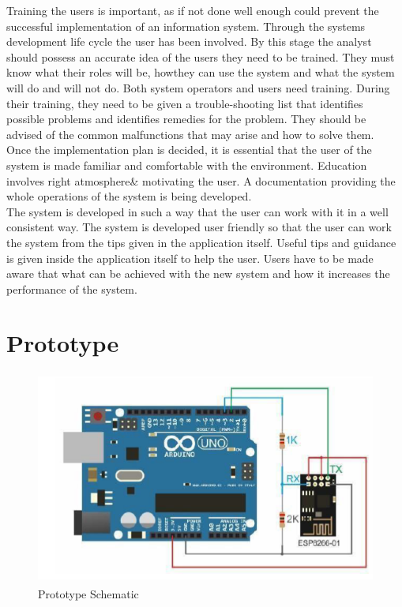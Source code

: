 Training the users is important, as if not done well enough could prevent the successful implementation of an information system. Through the systems development life cycle the user has been involved. By this stage the analyst should possess an accurate idea of the users they need to be trained. They must know what their roles will be, howthey can use the system and what the system will do and will not do. Both system operators and users need training. During their training, they need to be given a trouble-shooting list that identifies possible problems and identifies remedies for the problem. They should be advised of the common malfunctions that may arise and how to solve them.\\
Once the implementation plan is decided, it is essential that the user of the system is made familiar and comfortable with the environment. Education involves right atmosphere\& motivating the user. A documentation providing the whole operations of the system is being developed.\\
The system is developed in such a way that the user can work with it in a well consistent way. The system is developed user friendly so that the user can work the system from the tips given in the application itself. Useful tips and guidance is given inside the application itself to help the user. Users have to be made aware that what can be achieved with the new system and how it increases the performance of the system.

\chapter{Prototype}
\thispagestyle{fancy}
\begin{figure}[H]
	
	\centering
	\includegraphics[width=\linewidth,height=7cm] {./images/p9.png}
	\caption{Prototype Schematic}
	\label{manual}
\end{figure}

